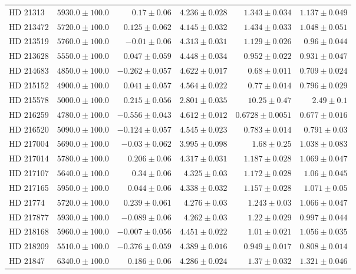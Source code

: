 \begin{longtable*}{lrrrrr}
HD 21313 & $5930.0\pm 100.0$ & $0.17\pm 0.06$ & $4.236\pm 0.028$ & $1.343\pm 0.034$ & $1.137\pm 0.049$ \\ 
HD 213472 & $5720.0\pm 100.0$ & $0.125\pm 0.062$ & $4.145\pm 0.032$ & $1.434\pm 0.033$ & $1.048\pm 0.051$ \\ 
HD 213519 & $5760.0\pm 100.0$ & $-0.01\pm 0.06$ & $4.313\pm 0.031$ & $1.129\pm 0.026$ & $0.96\pm 0.044$ \\ 
HD 213628 & $5550.0\pm 100.0$ & $0.047\pm 0.059$ & $4.448\pm 0.034$ & $0.952\pm 0.022$ & $0.931\pm 0.047$ \\ 
HD 214683 & $4850.0\pm 100.0$ & $-0.262\pm 0.057$ & $4.622\pm 0.017$ & $0.68\pm 0.011$ & $0.709\pm 0.024$ \\ 
HD 215152 & $4900.0\pm 100.0$ & $0.041\pm 0.057$ & $4.564\pm 0.022$ & $0.77\pm 0.014$ & $0.796\pm 0.029$ \\ 
HD 215578 & $5000.0\pm 100.0$ & $0.215\pm 0.056$ & $2.801\pm 0.035$ & $10.25\pm 0.47$ & $2.49\pm 0.1$ \\ 
HD 216259 & $4780.0\pm 100.0$ & $-0.556\pm 0.043$ & $4.612\pm 0.012$ & $0.6728\pm 0.0051$ & $0.677\pm 0.016$ \\ 
HD 216520 & $5090.0\pm 100.0$ & $-0.124\pm 0.057$ & $4.545\pm 0.023$ & $0.783\pm 0.014$ & $0.791\pm 0.03$ \\ 
HD 217004 & $5690.0\pm 100.0$ & $-0.03\pm 0.062$ & $3.995\pm 0.098$ & $1.68\pm 0.25$ & $1.038\pm 0.083$ \\ 
HD 217014 & $5780.0\pm 100.0$ & $0.206\pm 0.06$ & $4.317\pm 0.031$ & $1.187\pm 0.028$ & $1.069\pm 0.047$ \\ 
HD 217107 & $5640.0\pm 100.0$ & $0.34\pm 0.06$ & $4.325\pm 0.03$ & $1.172\pm 0.028$ & $1.06\pm 0.045$ \\ 
HD 217165 & $5950.0\pm 100.0$ & $0.044\pm 0.06$ & $4.338\pm 0.032$ & $1.157\pm 0.028$ & $1.071\pm 0.05$ \\ 
HD 21774 & $5720.0\pm 100.0$ & $0.239\pm 0.061$ & $4.276\pm 0.03$ & $1.243\pm 0.03$ & $1.066\pm 0.047$ \\ 
HD 217877 & $5930.0\pm 100.0$ & $-0.089\pm 0.06$ & $4.262\pm 0.03$ & $1.22\pm 0.029$ & $0.997\pm 0.044$ \\ 
HD 218168 & $5960.0\pm 100.0$ & $-0.007\pm 0.056$ & $4.451\pm 0.022$ & $1.01\pm 0.021$ & $1.056\pm 0.035$ \\ 
HD 218209 & $5510.0\pm 100.0$ & $-0.376\pm 0.059$ & $4.389\pm 0.016$ & $0.949\pm 0.017$ & $0.808\pm 0.014$ \\ 
HD 21847 & $6340.0\pm 100.0$ & $0.186\pm 0.06$ & $4.286\pm 0.024$ & $1.37\pm 0.032$ & $1.321\pm 0.046$ \\ 

\end{longtable*}
